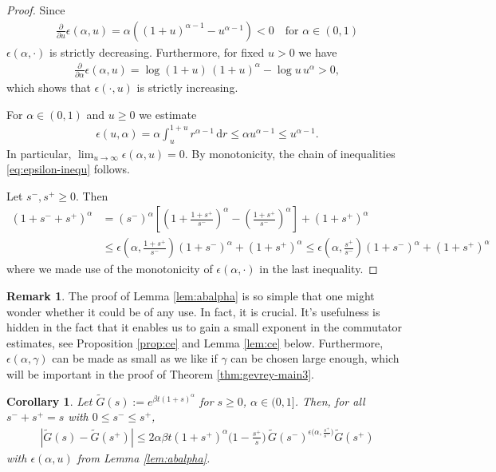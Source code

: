 \documentclass[11pt,a4paper,reqno]{amsart}
\theoremstyle{plain}
\newtheorem{corollary}[proposition]{Corollary}
\theoremstyle{definition}
\newtheorem{remark}[proposition]{Remark}
\begin{document}
\begin{proof}
Since
\begin{align*}
	\frac{\partial}{\partial u} \epsilon(\alpha, u) = \alpha \left( (1+u)^{\alpha-1} - u^{\alpha-1}\right) <0 \quad \text{for } \alpha\in(0,1)
\end{align*}
$\epsilon(\alpha, \cdot)$ is strictly decreasing. Furthermore, for fixed $u>0$ we have
\begin{align*}
	\frac{\partial}{\partial\alpha} \epsilon(\alpha,u) = \log(1+u)\, (1+u)^{\alpha} - \log u \, u^{\alpha} >0,
\end{align*}
which shows that $\epsilon(\cdot, u)$ is strictly increasing.

For $\alpha\in(0,1)$ and $u\geq 0$ we estimate
\begin{align*}
	\epsilon(u,\alpha) = \alpha \int_u^{1+u} r^{\alpha-1}\,\mathrm{d}r \leq \alpha u^{\alpha-1} \leq u^{\alpha-1}.
\end{align*}
In particular, $\lim_{u\to\infty} \epsilon(\alpha,u) = 0$. By monotonicity, the chain of inequalities \eqref{eq:epsilon-inequ} follows.

Let $s^-,s^+\ge 0$. Then
\begin{align*}
	(1+s^-+s^+)^\alpha &= (s^-)^{\alpha} \left[\left(1+\tfrac{1+s^+}{s^-}\right)^{\alpha} - \left(\tfrac{1+s^+}{s^-}\right)^{\alpha}\right] + (1+s^+)^{\alpha} \\
	&\leq \epsilon\left(\alpha,\tfrac{1+s^+}{s^-}\right)(1+s^-)^\alpha + (1+s^+)^\alpha \leq \epsilon\left(\alpha,\tfrac{s^+}{s^-}\right)(1+s^-)^\alpha + (1+s^+)^\alpha
\end{align*}
where we made use of the monotonicity of $\epsilon(\alpha, \cdot)$ in the last inequality.
\end{proof}

\begin{remark}
 The proof of Lemma \ref{lem:abalpha} is so simple that one might wonder whether it could be of any use. In fact, it is crucial. It's usefulness is hidden in the fact that it enables us to gain a small exponent in the commutator estimates, see Proposition \ref{prop:ce} and Lemma \ref{lem:ce} below. Furthermore, $\epsilon(\alpha, \gamma)$ can be made as small as we like if $\gamma$ can be chosen large enough, which will be important in the proof of Theorem \ref{thm:gevrey-main3}.
\end{remark}

\begin{corollary}\label{cor:expdiff}
Let $\widetilde{G}(s):= e^{\beta t (1+s)^{\alpha}}$ for $s\geq 0$, $\alpha\in(0,1]$. Then, for all $s^- + s^+ = s$ with $ 0\leq s^- \leq s^+$,
\begin{align*}
	|\widetilde{G}(s) - \widetilde{G}(s^+)| \leq 2 \alpha\beta t (1+s^+)^{\alpha} \big(1-\tfrac{s^+}{s}\big) \,\widetilde{G}(s^-)^{\epsilon\big(\alpha,\tfrac{s^+}{s^-}\big)} \widetilde{G}(s^+)
\end{align*}
with $\epsilon(\alpha,u)$ from Lemma \ref{lem:abalpha}.
\end{corollary}
\end{document}
